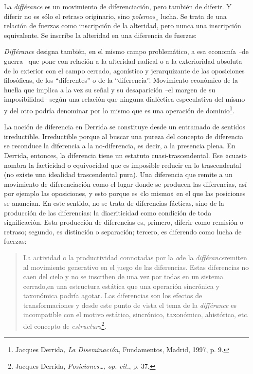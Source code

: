 La \emph{différance} es un movimiento de diferenciación, pero también de diferir. Y diferir no es sólo el retraso originario, sino \emph{polemos}¸ lucha. Se trata de una relación de fuerzas como inscripción de la alteridad, pero nunca una inscripción equivalente. Se inscribe la alteridad en una diferencia de fuerzas:

\emph{Différance} designa también, en el mismo campo problemático, a esa economía \emph{--}de guerra\emph{--} que pone con relación a la alteridad radical o a la exterioridad absoluta de lo exterior con el campo cerrado, agonístico y jerarquizante de las oposiciones filosóficas, de los ``diferentes'' o de la ``diferencia''. Movimiento económico de la huella que implica a la vez su señal y su desaparición \emph{--}el margen de su imposibilidad\emph{--} según una relación que ninguna dialéctica especulativa del mismo y del otro podría denominar por lo mismo que es una operación de dominio\footnote{Jacques Derrida\emph{, La Diseminación}, Fundamentos, Madrid, 1997, p. 9.}.

La noción de diferencia en Derrida se constituye desde un entramado de sentidos irreductible. Irreductible porque al buscar una pureza del concepto de diferencia se reconduce la diferencia a la no-diferencia, es decir, a la presencia plena. En Derrida, entonces, la diferencia tiene un estatuto cuasi-trascendental. Ese «cuasi» nombra la facticidad o equivocidad que es imposible reducir en lo trascendental (no existe una idealidad trascendental pura). Una diferencia que remite a un movimiento de diferenciación como el lugar donde se producen las diferencias, así por ejemplo las oposiciones, y esto porque es «lo mismo» en el que las posiciones se anuncian. En este sentido, no se trata de diferencias fácticas, sino de la producción de las diferencias: la diacriticidad como condición de toda significación. Esta producción de diferencias es, primero, diferir como remisión o retraso; segundo, es distinción o separación; tercero, es diferendo como lucha de fuerzas:

\begin{quote}
La actividad o la productividad connotadas por la \emph{a}de la \emph{différance}remiten al movimiento generativo en el juego de las diferencias. Estas diferencias no caen del cielo y no se inscriben de una vez por todas en un sistema cerrado,en una estructura estática que una operación sincrónica y taxonómica podría agotar. Las diferencias son los efectos de transformaciones y desde este punto de vista el tema de la \emph{différance} es incompatible con el motivo estático, sincrónico, taxonómico, ahistórico, etc. del concepto de \emph{estructura}\footnote{Jacques Derrida, \emph{Posiciones\ldots{}}, \emph{op. cit.}, p. 37.}\emph{.}
\end{quote}

